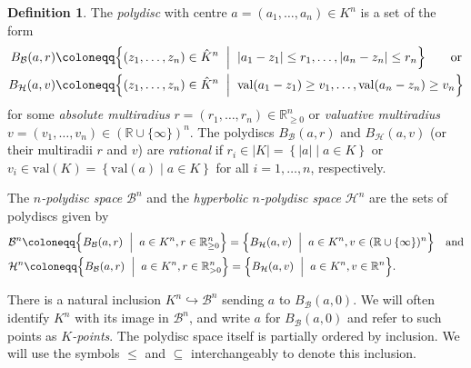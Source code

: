 \documentclass[10pt]{article}
\theoremstyle{definition}
\newtheorem{definition}[theorem]{Definition}
\newcommand{\RR}{\mathbb{R}}
\newcommand{\suchthat}{\;\ifnum\currentgrouptype=16 \middle\fi|\;}
\newcommand{\bigmid}{\left.\vphantom{\Big\{} \suchthat \vphantom{\Big\}}\right.}
\newcommand{\val}{{\mathrm{val}}}
\begin{document}
\begin{definition}\label{def:polydiscSpace}
  The \emph{polydisc} with centre $a=(a_1,\dots,a_n)\in K^n$ is a set of the form
  \begin{align*}
      B_{\mathcal{B}}(a,r)\coloneqq& \Big\{ (z_1,\dots,z_n)\in \hat{K}^n \bigmid |a_1-z_1|\leq r_1, \dots, |a_n-z_n|\leq r_n \Big\} \qquad\text{or}\\ 
    B_{\mathcal{H}}(a,v) \coloneqq& \Big\{ (z_1,\dots,z_n)\in \hat{K}^n \bigmid \val(a_1-z_1)\geq v_1, \dots, \val(a_n-z_n)\geq v_n \Big\}
  \end{align*}
  for some \emph{absolute multiradius} $r=(r_1,\dots,r_n)\in \RR_{\geq 0}^n$ or \emph{valuative multiradius} $v=(v_1,\dots,v_n)\in(\RR\cup\{\infty\})^n$.
  The polydiscs $B_{\mathcal{B}}(a, r)$ and $B_{\mathcal{H}}(a, v)$ (or their multiradii $r$ and $v$) are \emph{rational} if $r_i\in |K| = \left\{ |a| \mid a \in K \right\}$ or $v_i\in \val(K)= \left\{ \val(a) \mid a \in K \right\}$ for all $i=1,\dots,n$, respectively.

  The \emph{$n$-polydisc space} $\mathcal B^n$ and the \emph{hyperbolic $n$-polydisc space} $\mathcal H^n$ are the sets of polydiscs given by
  \begin{align*}
    &\mathcal B^n \coloneqq \Big\{ B_{\mathcal{B}}(a,r) \bigmid a\in K^n, r\in \RR_{\geq 0}^n \Big\} = \Big\{ B_{\mathcal{H}}(a,v) \bigmid a\in K^n, v\in(\RR\cup\{\infty\})^n \Big\} \quad\text{and}\\
    &\mathcal H^n \coloneqq \Big\{ B_{\mathcal{B}}(a,r) \bigmid a\in K^n, r\in \RR_{> 0}^n \Big\} = \Big\{ B_{\mathcal{H}}(a,v) \bigmid a\in K^n, v\in \RR^n \Big\}.
  \end{align*}
\end{definition}

There is a natural inclusion $K^n \hookrightarrow \mathcal B^n$ sending $a$ to $B_{\mathcal{B}}(a,0)$. We will often identify $K^n$ with its image in $\mathcal B^n$, and write $a$ for $B_{\mathcal{B}}(a,0)$ and refer to such points as \emph{$K$-points}.  The polydisc space itself is partially ordered by inclusion. We will use the symbols $\le$ and $\subseteq$ interchangeably to denote this inclusion.
\end{document}
